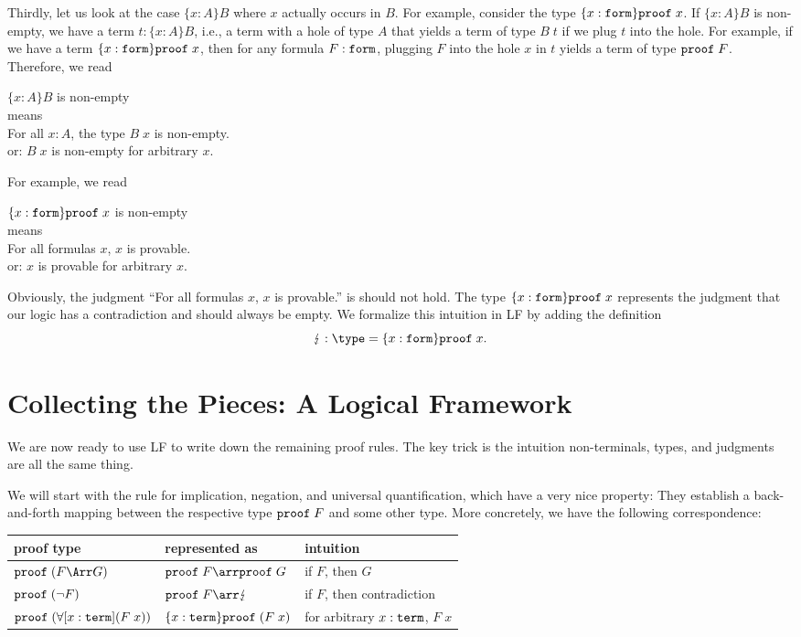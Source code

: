 Thirdly, let us look at the case $\{x:A\}B$ where $x$ actually occurs in $B$. For example, consider the type $\{x:\mathtt{form}\}\mathtt{proof}\;x$.
If $\{x:A\}B$ is non-empty, we have a term $t:\{x:A\}B$, i.e., a term with a hole of type $A$ that yields a term of type $B\;t$ if we plug $t$ into the hole.
For example, if we have a term $\{x:\mathtt{form}\}\mathtt{proof}\;x$, then for any formula $F:\mathtt{form}$, plugging $F$ into the hole $x$ in $t$ yields a term of type $\mathtt{proof}\;F$.
Therefore, we read
\begin{center}
$\{x:A\}B$ is non-empty\\ means \\ For all $x:A$, the type $B\;x$ is non-empty. \\ or: $B\;x$ is non-empty for arbitrary $x$.
\end{center}
For example, we read
\begin{center}
$\{x:\mathtt{form}\}\mathtt{proof}\;x$ is non-empty\\ means \\ For all formulas $x$, $x$ is provable. \\ or: $x$ is provable for arbitrary $x$.
\end{center}
\medskip

Obviously, the judgment ``For all formulas $x$, $x$ is provable.'' is should not hold. The type $\{x:\mathtt{form}\}\mathtt{proof}\;x$ represents the judgment that our logic has a contradiction and should always be empty. We formalize this intuition in LF by adding the definition
\[\contra : \type = \{x:\FORM\}\PROOF\;x.\]


\section{Collecting the Pieces: A Logical Framework}

We are now ready to use LF to write down the remaining proof rules. The key trick is the intuition non-terminals, types, and judgments are all the same thing.

We will start with the rule for implication, negation, and universal quantification, which have a very nice property: They establish a back-and-forth mapping between the respective type $\mathtt{proof}\;F$ and some other type. More concretely, we have the following correspondence:

\begin{center}
\begin{tabular}{|l|l|l|}
\hline
proof type & represented as & intuition \\
\hline
$\PROOF\;(F\impl G)$ & $\PROOF\;F\arr\PROOF\;G$ & if $F$, then $G$ \\
$\mathtt{proof}\;(\neg F)$ & $\PROOF\;F\arr\contra$ & if $F$, then contradiction \\
$\mathtt{proof}\;(\forall[x:\mathtt{term}](F\;x))$ & $\{x:\mathtt{term}\}\mathtt{proof}\;(F\;x)$ & for arbitrary $x:\mathtt{term}$, $F\;x$\\
\hline
\end{tabular}
\end{center}

